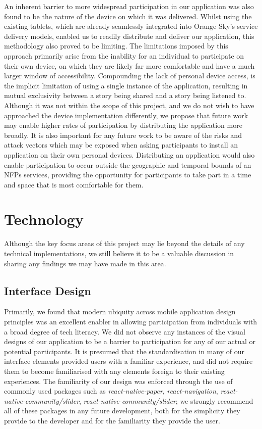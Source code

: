An inherent barrier to more widespread participation in our application was also found to be the nature of the device on which it was delivered. Whilst using the existing tablets, which are already seamlessly integrated into Orange Sky's service delivery models, enabled us to readily distribute and deliver our application, this methodology also proved to be limiting. The limitations imposed by this approach primarily arise from the inability for an individual to participate on their own device, on which they are likely far more comfortable and have a much larger window of accessibility. Compounding the lack of personal device access, is the implicit limitation of using a single instance of the application, resulting in mutual exclusivity between a story being shared and a story being listened to. Although it was not within the scope of this project, and we do not wish to have approached the device implementation differently, we propose that future work may enable higher rates of participation by distributing the application more broadly. It is also important for any future work to be aware of the risks and attack vectors which may be exposed when asking participants to install an application on their own personal devices. Distributing an application would also enable participation to occur outside the geographic and temporal bounds of an NFPs services, providing the opportunity for participants to take part in a time and space that is most comfortable for them.

\section{Technology}

Although the key focus areas of this project may lie beyond the details of any technical implementations, we still believe it to be a valuable discussion in sharing any findings we may have made in this area.

\subsection{Interface Design}

Primarily, we found that modern ubiquity across mobile application design principles was an excellent enabler in allowing participation from individuals with a broad degree of tech literacy. We did not observe any instances of the visual designs of our application to be a barrier to participation for any of our actual or potential participants. It is presumed that the standardisation in many of our interface elements provided users with a familiar experience, and did not require them to become familiarised with any elements foreign to their existing experiences. The familiarity of our design was enforced through the use of commonly used packages such as \emph{react-native-paper}, \emph{react-navigation}, \emph{react-native-community/slider}, \emph{react-native-community/slider}; we strongly recommend all of these packages in any future development, both for the simplicity they provide to the developer and for the familiarity they provide the user.

